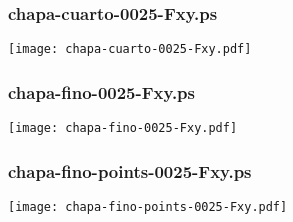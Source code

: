 \documentclass{beamer}
\begin{document}
\begin{frame}
\frametitle{chapa-cuarto-0025-Fxy.ps}
\texttt{[image: chapa-cuarto-0025-Fxy.pdf]}
\end{frame}
\begin{frame}
\frametitle{chapa-fino-0025-Fxy.ps}
\texttt{[image: chapa-fino-0025-Fxy.pdf]}
\end{frame}
\begin{frame}
\frametitle{chapa-fino-points-0025-Fxy.ps}
\texttt{[image: chapa-fino-points-0025-Fxy.pdf]}
\end{frame}
\end{document}
